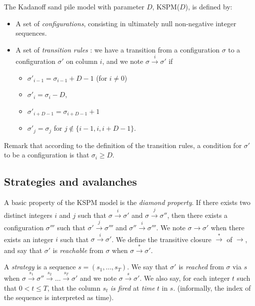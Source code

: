\documentclass[11pt,a4paper]{llncs}
\begin{document}
\begin{definition}
The   Kadanoff sand pile model with parameter $D$, KSPM($D$), is defined by:
  \begin{itemize}
    \item A set of \emph{configurations}, consisting in ultimately null non-negative integer sequences.
    \item A set of \emph{transition rules} : we have a transition from a configuration $\sigma$ to a configuration $\sigma '$ on column $i$, and we note   $\sigma \overset{i}{\rightarrow} \sigma'$ if  
    \begin{itemize}
\item $\sigma'_{i-1}=\sigma_{i-1} + D-1$ (for $i \neq 0$)
\item $\sigma'_i = \sigma_i - D$, 
\item $\sigma'_{i+D-1} = \sigma_{i+D-1} + 1$
\item $\sigma'_j = \sigma_j$ for $j \not\in  \{i-1, i, i+D-1 \}$. 
\end{itemize}

  \end{itemize}
\end{definition}

Remark that according to the definition of the transition rules, a condition for $\sigma'$ to be a configuration is that $\sigma_i \geq D$.

\subsection{Strategies and avalanches}


A basic property of the KSPM model is the \emph{diamond property}. If there exists two distinct integers $i$ and $j$ such that 
$\sigma \overset{i}{\rightarrow} \sigma'$ and $\sigma \overset{j}{\rightarrow} \sigma''$, then there exists a configuration $\sigma'''$ such that $\sigma' \overset{j}{\rightarrow} \sigma'''$  and $\sigma'' \overset{i}{\rightarrow} \sigma'''$. 
We  note $\sigma \rightarrow \sigma'$ when there exists an integer $i$ such that $\sigma \overset{i}{\rightarrow} \sigma'$. 
We define the transitive closure $\overset{*}{\rightarrow}$ of $\rightarrow$, and say that $\sigma'$ is {\em reachable} from $\sigma$ when  $\sigma \overset{*}{\rightarrow} \sigma'$.

A {\em strategy} is a sequence $s=(s_1,\dots,s_T)$. We say that $\sigma'$ is {\em reached} from $\sigma$ via $s$ when $\sigma \overset{s_1}{\rightarrow} \sigma'' \overset{s_2}{\rightarrow} \dots \overset{s_T}{\rightarrow} \sigma'$ and we note $\sigma \overset{s}{\rightarrow} \sigma'$. 
We also say,  for each integer $t$ such that $0 < t \leq T$, that the column $s_t$ \emph{is fired} at \emph{time} $t$ in $s$. (informally,  the index of the sequence is interpreted as time). 
\end{document}

